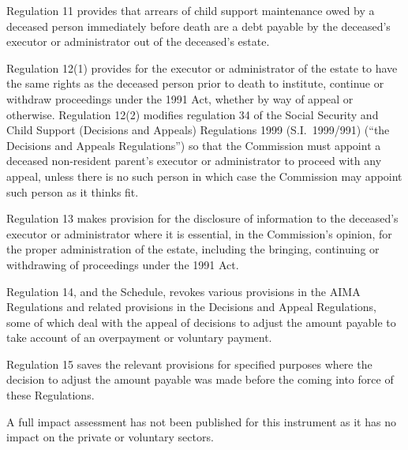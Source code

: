 \documentclass[12pt,a4paper]{article}
\begin{document}
Regulation 11 provides that arrears of child support maintenance owed by a deceased person immediately before death are a debt payable by the deceased’s executor or administrator out of the deceased’s estate.

Regulation 12(1) provides for the executor or administrator of the estate to have the same rights as the deceased person prior to death to institute, continue or withdraw proceedings under the 1991 Act, whether by way of appeal or otherwise. Regulation 12(2) modifies regulation 34 of the Social Security and Child Support (Decisions and Appeals) Regulations 1999 (S.I.~1999/991) (“the Decisions and Appeals Regulations”) so that the Commission must appoint a deceased non-resident parent’s executor or administrator to proceed with any appeal, unless there is no such person in which case the Commission may appoint such person as it thinks fit.

Regulation 13 makes provision for the disclosure of information to the deceased’s executor or administrator where it is essential, in the Commission’s opinion, for the proper administration of the estate, including the bringing, continuing or withdrawing of proceedings under the 1991 Act.

Regulation 14, and the Schedule, revokes various provisions in the AIMA Regulations and related provisions in the Decisions and Appeal Regulations, some of which deal with the appeal of decisions to adjust the amount payable to take account of an overpayment or voluntary payment.

Regulation 15 saves the relevant provisions for specified purposes where the decision to adjust the amount payable was made before the coming into force of these Regulations.

A full impact assessment has not been published for this instrument as it has no impact on the private or voluntary sectors. 
\end{document}
